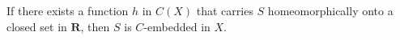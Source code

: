 If there exists a function $h$ in $C(X)$ that carries $S$ homeomorphically onto a closed set in $\mathbf{R}$, then $S$ is $C$-embedded in $X$.
